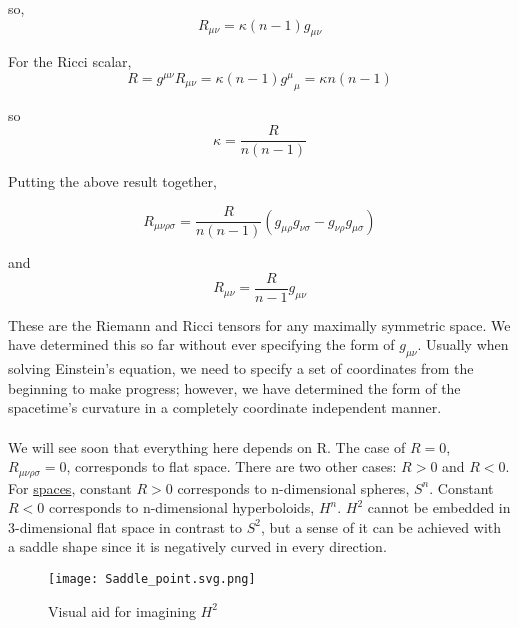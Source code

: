 \documentclass[10pt]{article}
\begin{document}
     so, 
     \begin{equation}
         {R}_{\mu\nu} = \kappa(n-1){g}_{\mu\nu}
     \end{equation}
     
     For the Ricci scalar,
    \begin{equation}
             R = {g}^{\mu\nu}{R}_{\mu\nu} = \kappa(n-1) {{g}^{\mu}}_{\mu} = \kappa n(n-1)
    \end{equation} 

     so
    \begin{equation}
        \kappa = \frac{R}{n(n-1)}
    \end{equation}
    
    Putting the above result together, 
    
    \begin{equation}
        {R}_{\mu\nu\rho\sigma} = \frac{R}{n(n-1)}({g}_{\mu\rho}{g}_{\nu\sigma} - {g}_{\nu\rho}{g}_{\mu\sigma})
    \end{equation}
    
    and 
    \begin{equation}
        {R}_{\mu\nu} = \frac{R}{n-1}{g}_{\mu\nu}
    \end{equation}
    
    These are the Riemann and Ricci tensors for any maximally symmetric space. We have determined this so far without ever specifying the form of ${g}_{\mu\nu}$. Usually when solving Einstein's equation, we need to specify a set of coordinates from the beginning to make progress; however, we have determined the form of the spacetime's curvature in a completely coordinate independent manner. 
    
    \paragraph{}We will see soon that everything here depends on R. The case of $R=0$, ${R}_{\mu\nu\rho\sigma} = 0$, corresponds to flat space. There are two other cases: $R > 0$ and $R < 0$. For \underline{spaces}, constant $R>0$ corresponds to n-dimensional spheres, ${S}^{n}$. Constant $R<0$ corresponds to n-dimensional hyperboloids, ${H}^{n}$. ${H}^{2}$ cannot be embedded in 3-dimensional flat space in contrast to ${S}^{2}$, but a sense of it can be achieved with a saddle shape since it is negatively curved in every direction. 
     
    \begin{figure}[h]
         \centering
         \texttt{[image: Saddle\_point.svg.png]}
        \caption{Visual aid for imagining ${H}^{2}$}
         \label{fig:my_label}
    \end{figure}
    
\end{document}
